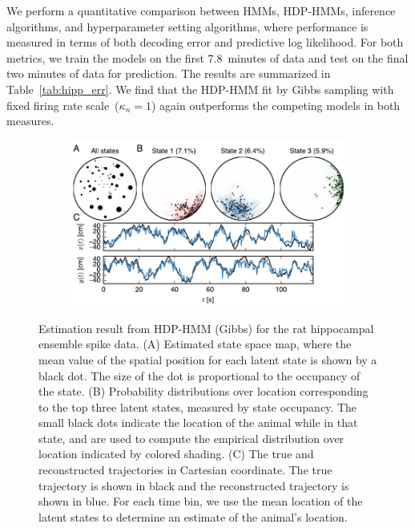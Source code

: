 We perform a quantitative comparison between HMMs, HDP-HMMs, inference
algorithms, and hyperparameter setting algorithms, where performance
is measured in terms of both decoding error and predictive log
likelihood. For both metrics, we train the models on the first
$7.8$~minutes of data and test on the final two minutes of data for
prediction. The results are summarized in Table~\ref{tab:hipp_err}. We
find that the HDP-HMM fit by Gibbs sampling with fixed firing rate
scale~($\kappa_n=1$) again outperforms the competing models in both
measures.

\begin{figure}[t!]
  \centering
  \begin{subfigure}[t]{5in}
    \includegraphics[width=\textwidth]{figures/ch7/Fig5.pdf}
  \end{subfigure}
  \caption[Place fields inferred by an HDP-HMM applied to rat
    hippocampal data]{Estimation result from HDP-HMM (Gibbs) for the
    rat hippocampal ensemble spike data. (A) Estimated state space
    map, where the mean value of the spatial position for each latent
    state is shown by a black dot. The size of the dot is proportional
    to the occupancy of the state.  (B) Probability distributions over
    location corresponding to the top three latent states, measured by
    state occupancy. The small black dots indicate the location of the
    animal while in that state, and are used to compute the empirical
    distribution over location indicated by colored shading. (C) The
    true and reconstructed trajectories in Cartesian coordinate. The
    true trajectory is shown in black and the reconstructed trajectory
    is shown in blue. For each time bin, we use the mean location of
    the latent states to determine an estimate of the animal's
    location. }
  \label{fig5}
\end{figure}


